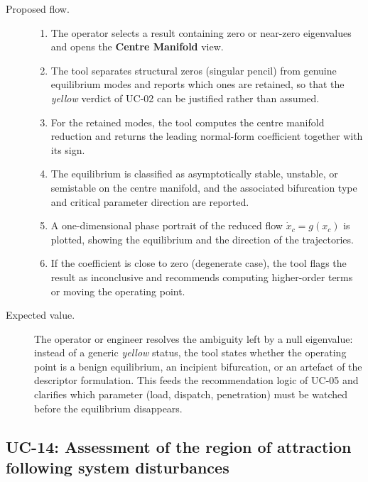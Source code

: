 \begin{description}
  \item[Proposed flow.]
        \begin{enumerate}[before=\leavevmode, leftmargin=*]
          \item The operator selects a result containing zero or near-zero eigenvalues and opens the \textbf{Centre Manifold} view.
          \item The tool separates structural zeros (singular pencil) from genuine equilibrium modes and reports which ones are retained, so that the \emph{yellow} verdict of UC-02 can be justified rather than assumed.
          \item For the retained modes, the tool computes the centre manifold reduction and returns the leading normal-form coefficient together with its sign.
          \item The equilibrium is classified as asymptotically stable, unstable, or semistable on the centre manifold, and the associated bifurcation type and critical parameter direction are reported.
          \item A one-dimensional phase portrait of the reduced flow $\dot{x}_c=g(x_c)$ is plotted, showing the equilibrium and the direction of the trajectories.
          \item If the coefficient is close to zero (degenerate case), the tool flags the result as inconclusive and recommends computing higher-order terms or moving the operating point.
        \end{enumerate}
  \item[Expected value.] The operator or engineer resolves the ambiguity left by a null eigenvalue: instead of a generic \emph{yellow} status, the tool states whether the operating point is a benign equilibrium, an incipient bifurcation, or an artefact of the descriptor formulation. This feeds the recommendation logic of UC-05 and clarifies which parameter (load, dispatch, penetration) must be watched before the equilibrium disappears.
\end{description}

\subsection{UC-14: Assessment of the region of attraction following system disturbances}

